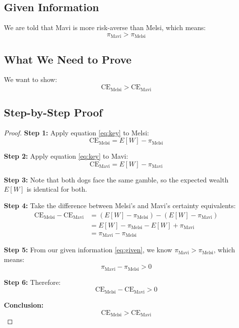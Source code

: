 \documentclass[11pt]{article}
\theoremstyle{definition}
\begin{document}
\subsection{Given Information}

We are told that Mavi is more risk-averse than Melsi, which means:
\begin{equation}
\pi_{\text{Mavi}} > \pi_{\text{Melsi}} \label{eq:given}
\end{equation}

\subsection{What We Need to Prove}

We want to show:
\[
\text{CE}_{\text{Melsi}} > \text{CE}_{\text{Mavi}}
\]

\subsection{Step-by-Step Proof}

\begin{proof}

\textbf{Step 1:} Apply equation \eqref{eq:key} to Melsi:
\[
\text{CE}_{\text{Melsi}} = E[W] - \pi_{\text{Melsi}}
\]

\textbf{Step 2:} Apply equation \eqref{eq:key} to Mavi:
\[
\text{CE}_{\text{Mavi}} = E[W] - \pi_{\text{Mavi}}
\]

\textbf{Step 3:} Note that both dogs face the same gamble, so the expected wealth $E[W]$ is identical for both.

\textbf{Step 4:} Take the difference between Melsi's and Mavi's certainty equivalents:
\begin{align*}
\text{CE}_{\text{Melsi}} - \text{CE}_{\text{Mavi}} &= (E[W] - \pi_{\text{Melsi}}) - (E[W] - \pi_{\text{Mavi}})\\
&= E[W] - \pi_{\text{Melsi}} - E[W] + \pi_{\text{Mavi}}\\
&= \pi_{\text{Mavi}} - \pi_{\text{Melsi}}
\end{align*}

\textbf{Step 5:} From our given information \eqref{eq:given}, we know $\pi_{\text{Mavi}} > \pi_{\text{Melsi}}$, which means:
\[
\pi_{\text{Mavi}} - \pi_{\text{Melsi}} > 0
\]

\textbf{Step 6:} Therefore:
\[
\text{CE}_{\text{Melsi}} - \text{CE}_{\text{Mavi}} > 0
\]

\textbf{Conclusion:}
\[
\boxed{\text{CE}_{\text{Melsi}} > \text{CE}_{\text{Mavi}}}
\]

\end{proof}
\end{document}
